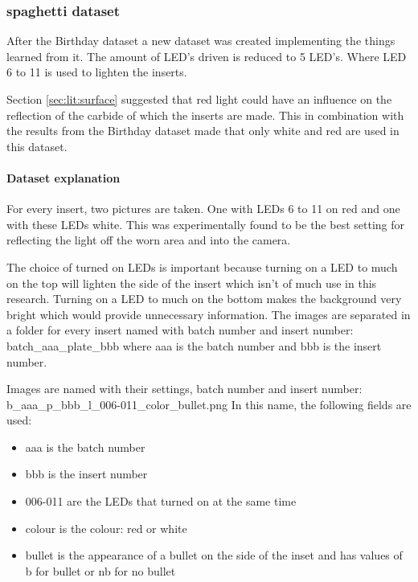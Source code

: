 \subsubsection{spaghetti dataset}

After the Birthday dataset a new dataset was created implementing the things learned from it. The amount of LED's driven is reduced to 5 LED's. Where LED 6 to 11 is used to lighten the inserts. 

Section \ref{sec:lit:surface} suggested that red light could have an influence on the reflection of the carbide of which the inserts are made. This in combination with the results from the Birthday dataset made that only white and red are used in this dataset.  

\paragraph{Dataset explanation}

For every insert, two pictures are taken. One with LEDs 6 to 11 on red and one with these LEDs white. This was experimentally found to be the best setting for reflecting the light off the worn area and into the camera. 

The choice of turned on LEDs is important because turning on a LED to much on the top will lighten the side of the insert which isn't of much use in this research. Turning on a LED to much on the bottom makes the background very bright which would provide unnecessary information.
The images are separated in a folder for every insert named with batch number and insert number:
batch\_aaa\_plate\_bbb where aaa is the batch number and bbb is the insert number.

Images are named with their settings, batch number and insert number:
b\_aaa\_p\_bbb\_l\_006-011\_color\_bullet.png 
In this name, the following fields are used:

\begin{itemize}
\item aaa is the batch number
\item bbb is the insert number
\item 006-011 are the LEDs that turned on at the same time
\item colour is the colour: red or white
\item bullet is the appearance of a bullet on the side of the inset and has values of b for bullet or nb for no bullet
\end{itemize}



